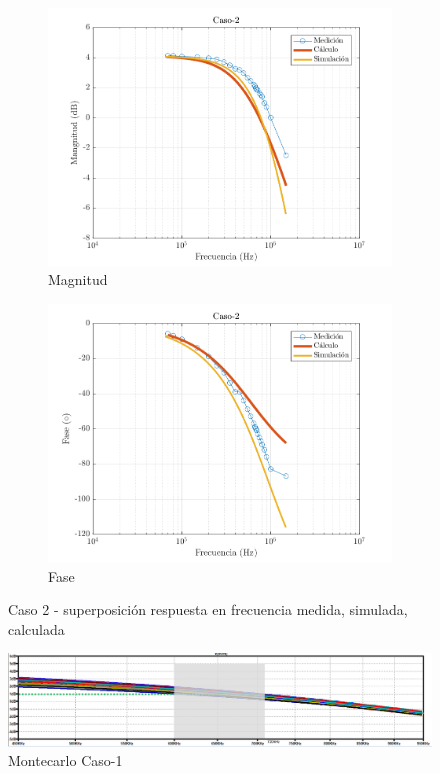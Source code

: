 \documentclass[../../main.tex]{subfiles}
\begin{document}
\begin{figure}[H]
\centering
\begin{subfigure}[http]{0.49\textwidth}
\includegraphics[width=\textwidth]{Caso-2_mag_n}
\caption{Magnitud}\label{fig=magnC2}
\end{subfigure}
\begin{subfigure}[http]{0.49\textwidth}
\includegraphics[width=\textwidth]{Caso-2_fase_n}
\caption{Fase}
\end{subfigure}
\caption{Caso 2 - superposición respuesta en  frecuencia medida, simulada, calculada}
\end{figure}

\begin{figure}[H]
\centering
\includegraphics[width=1\textwidth]{montecarlo_n_c2}
\caption{Montecarlo Caso-1} \label{fig=mcnC2}
\end{figure}
\end{document}
